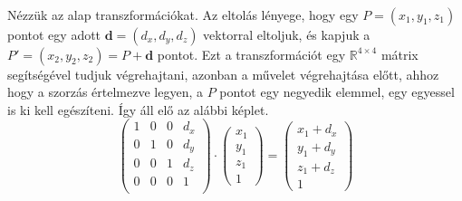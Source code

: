 \documentclass[12pt]{report}
\begin{document}
\paragraph{}
Nézzük az alap transzformációkat. Az eltolás lényege, hogy egy $P = (x_1, y_1, z_1)$ pontot egy adott $\mathbf{d} = (d_x, d_y, d_z)$ vektorral eltoljuk, és kapjuk a $P' = (x_2, y_2, z_2) = P + \mathbf{d}$ pontot. Ezt a transzformációt egy $\mathbb{R}^{4\times4}$ mátrix segítségével tudjuk végrehajtani, azonban a művelet végrehajtása előtt, ahhoz hogy a szorzás értelmezve legyen, a $P$ pontot egy negyedik elemmel, egy egyessel is ki kell egészíteni. Így áll elő az alábbi képlet.
$$
\left( \begin{array}{cccc}
	1 & 0 & 0 & d_x \\
	0 & 1 & 0 & d_y \\
	0 & 0 & 1 & d_z \\
	0 & 0 & 0 & 1 \\
\end{array} \right)
\cdot
\left( \begin{array}{c}
	x_1 \\
	y_1 \\
	z_1 \\
	1 \end{array}
\right)
=
\left( \begin{array}{c}
	x_1 + d_x \\
	y_1 + d_y \\
	z_1 + d_z \\
	1 \end{array}
\right)
$$
\end{document}
